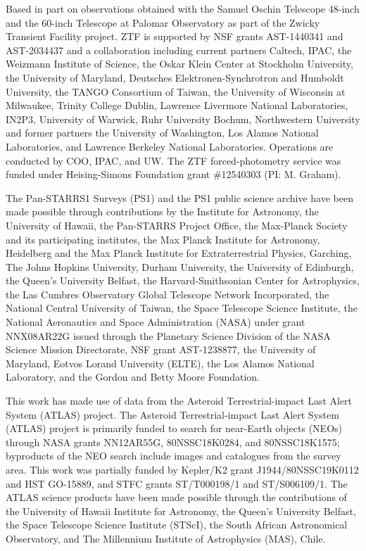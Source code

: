 \documentclass{nature_plusfigure}
\begin{document}
\begin{addendum}
Based in part on observations obtained with the Samuel Oschin Telescope 48-inch and the 60-inch Telescope at Palomar Observatory as part of the Zwicky Transient Facility project. ZTF is supported by NSF grants AST-1440341 and AST-2034437 and a collaboration including current partners Caltech, IPAC, the Weizmann Institute of Science, the Oskar Klein Center at Stockholm University, the University of Maryland, Deutsches Elektronen-Synchrotron and Humboldt University, the TANGO Consortium of Taiwan, the University of Wisconsin at Milwaukee, Trinity College Dublin, Lawrence Livermore National Laboratories, IN2P3, University of Warwick, Ruhr University Bochum, Northwestern University and former partners the University of Washington, Los Alamos National Laboratories, and Lawrence Berkeley National Laboratories. Operations are conducted by COO, IPAC, and UW.
The ZTF forced-photometry service was funded under Heising-Simons Foundation grant \#12540303 (PI: M. Graham).

The Pan-STARRS1 Surveys (PS1) and the PS1 public science archive have been made possible through contributions by the Institute for Astronomy, the University of Hawaii, the Pan-STARRS Project Office, the Max-Planck Society and its participating institutes, the Max Planck Institute for Astronomy, Heidelberg and the Max Planck Institute for Extraterrestrial Physics, Garching, The Johns Hopkins University, Durham University, the University of Edinburgh, the Queen's University Belfast, the Harvard-Smithsonian Center for Astrophysics, the Las Cumbres Observatory Global Telescope Network Incorporated, the National Central University of Taiwan, the Space Telescope Science Institute, the National Aeronautics and Space Administration (NASA) under grant NNX08AR22G issued through the Planetary Science Division of the NASA Science Mission Directorate, NSF grant AST-1238877, the University of Maryland, Eotvos Lorand University (ELTE), the Los Alamos National Laboratory, and the Gordon and Betty Moore Foundation.

This work has made use of data from the Asteroid Terrestrial-impact Last Alert System (ATLAS) project. The Asteroid Terrestrial-impact Last Alert System (ATLAS) project is primarily funded to search for near-Earth objects (NEOs) through NASA grants NN12AR55G, 80NSSC18K0284, and 80NSSC18K1575; byproducts of the NEO search include images and catalogues from the survey area. This work was partially funded by Kepler/K2 grant J1944/80NSSC19K0112 and HST GO-15889, and STFC grants ST/T000198/1 and ST/S006109/1. The ATLAS science products have been made possible through the contributions of the University of Hawaii Institute for Astronomy, the Queen’s University Belfast, the Space Telescope Science Institute (STScI), the South African Astronomical Observatory, and The Millennium Institute of Astrophysics (MAS), Chile.


\end{addendum}
\end{document}
